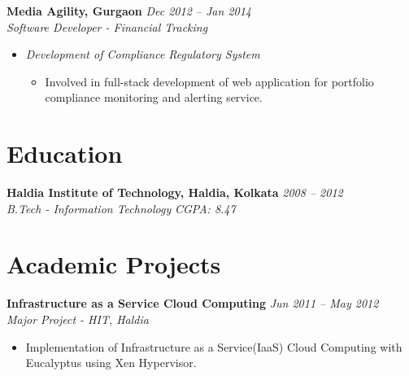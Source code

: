 \documentclass[margin,line]{resume}
\begin{document}
\begin{resume}
    \textbf{Media Agility, Gurgaon}   \hfill \textsl{Dec 2012 -- Jan 2014} \vspace{0mm}\\\vspace{0mm}%
           \textsl{Software Developer - Financial Tracking}\\
    \begin{itemize}
    
     \item \textsl{Development of Compliance Regulatory System} 
        \begin{itemize}
            \item Involved in full-stack development of web application for portfolio compliance monitoring and alerting service.
        \end{itemize}
    
    \end{itemize}
        
    \section{\mysidestyle Education}

    \textbf{Haldia Institute of Technology, Haldia, Kolkata} \hfill \textsl{2008 -- 2012}\vspace{0mm}\\\vspace{0mm}%
    \textsl{B.Tech - Information Technology} \hfill \textsl{CGPA: 8.47}



    \section{\mysidestyle Academic Projects}
    \textbf{Infrastructure as a Service Cloud Computing} \hfill \textsl{Jun 2011 -- May 2012}\vspace{0mm}\\\vspace{0mm}%
    \textsl{Major Project - HIT, Haldia} 
       \begin{itemize} 
	        \item Implementation of Infrastructure as a Service(IaaS) Cloud Computing with Eucalyptus using Xen Hypervisor.
       \end{itemize}


\end{resume}
\end{document}
